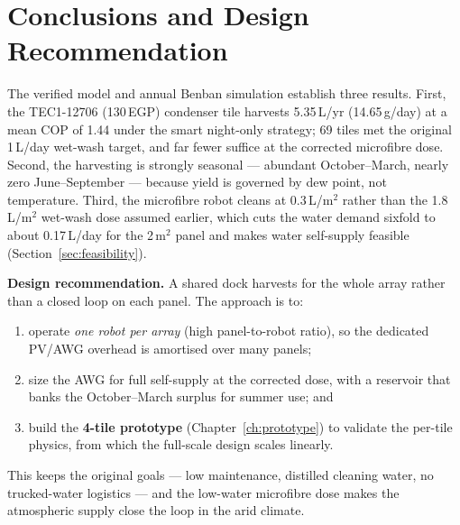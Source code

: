 \documentclass[12pt,a4paper]{report}
\newcommand{\num}[1]{#1}
\newcommand{\SI}[2]{#1\,\mbox{#2}}
\newcommand{\per}{/}
\newcommand{\gram}{g}\newcommand{\kg}{kg}\newcommand{\kilogram}{kg}
\newcommand{\liter}{L}\newcommand{\litre}{L}
\newcommand{\dy}{day}\newcommand{\yr}{yr}
\newcommand{\sqm}{m\ensuremath{^{2}}}
\begin{document}
\chapter{Conclusions and Design Recommendation}
\label{ch:conclusion}

The verified model and annual Benban simulation establish three results. First,
the TEC1-12706 (\SI{130}{EGP}) condenser tile harvests \SI{5.35}{\liter\per\yr}
(\SI{14.65}{\gram\per\dy}) at a mean COP of \num{1.44} under the smart
night-only strategy; \num{69} tiles met the original \SI{1}{\liter\per\dy}
wet-wash target, and far fewer suffice at the corrected microfibre dose.
Second, the harvesting is strongly seasonal --- abundant October--March, nearly
zero June--September --- because yield is governed by dew point, not
temperature. Third, the microfibre robot cleans at \SI{0.3}{\liter\per\sqm}
rather than the \SI{1.8}{\liter\per\sqm} wet-wash dose assumed earlier, which
cuts the water demand sixfold to about \SI{0.17}{\liter\per\dy} for the
\SI{2}{\sqm} panel and makes water self-supply feasible
(Section~\ref{sec:feasibility}).

\noindent\textbf{Design recommendation.} A shared dock harvests for the whole
array rather than a closed loop on each panel. The approach is to:
\begin{enumerate}
  \item operate \emph{one robot per array} (high panel-to-robot ratio), so the
        dedicated PV/AWG overhead is amortised over many panels;
  \item size the AWG for full self-supply at the corrected dose, with a
        reservoir that banks the October--March surplus for summer use; and
  \item build the \textbf{4-tile prototype} (Chapter~\ref{ch:prototype}) to
        validate the per-tile physics, from which the full-scale design scales
        linearly.
\end{enumerate}
This keeps the original goals --- low maintenance, distilled cleaning water, no
trucked-water logistics --- and the low-water microfibre dose makes the
atmospheric supply close the loop in the arid climate.



\end{document}
